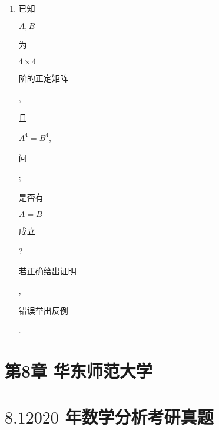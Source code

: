 \documentclass[10pt]{article}
\begin{document}
\begin{enumerate}
  \item \begin{CJK}{UTF8}{mj}已知\end{CJK} $A, B$ \begin{CJK}{UTF8}{mj}为\end{CJK} $4 \times 4$ \begin{CJK}{UTF8}{mj}阶的正定矩阵\end{CJK}, \begin{CJK}{UTF8}{mj}且\end{CJK} $A^{4}=B^{4}$, \begin{CJK}{UTF8}{mj}问\end{CJK}; \begin{CJK}{UTF8}{mj}是否有\end{CJK} $A=B$ \begin{CJK}{UTF8}{mj}成立\end{CJK}? \begin{CJK}{UTF8}{mj}若正确给出证明\end{CJK}, \begin{CJK}{UTF8}{mj}错误举出反例\end{CJK}.

\end{enumerate}
\section{第8章 华东师范大学}
\section{$8.12020$ 年数学分析考研真题}
\end{document}
